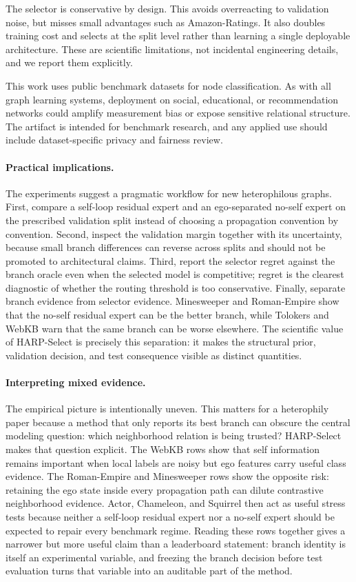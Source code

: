 \documentclass[letterpaper]{article} %
\newcommand{\method}{HARP-Select}
\begin{document}
The selector is conservative by design.
This avoids overreacting to validation noise, but misses small advantages such as Amazon-Ratings.
It also doubles training cost and selects at the split level rather than learning a single deployable architecture.
These are scientific limitations, not incidental engineering details, and we report them explicitly.

This work uses public benchmark datasets for node classification.
As with all graph learning systems, deployment on social, educational, or recommendation networks could amplify measurement bias or expose sensitive relational structure.
The artifact is intended for benchmark research, and any applied use should include dataset-specific privacy and fairness review.

\paragraph{Practical implications.}
The experiments suggest a pragmatic workflow for new heterophilous graphs.
First, compare a self-loop residual expert and an ego-separated no-self expert on the prescribed validation split instead of choosing a propagation convention by convention.
Second, inspect the validation margin together with its uncertainty, because small branch differences can reverse across splits and should not be promoted to architectural claims.
Third, report the selector regret against the branch oracle even when the selected model is competitive; regret is the clearest diagnostic of whether the routing threshold is too conservative.
Finally, separate branch evidence from selector evidence.
Minesweeper and Roman-Empire show that the no-self residual expert can be the better branch, while Tolokers and WebKB warn that the same branch can be worse elsewhere.
The scientific value of \method{} is precisely this separation: it makes the structural prior, validation decision, and test consequence visible as distinct quantities.

\paragraph{Interpreting mixed evidence.}
The empirical picture is intentionally uneven.
This matters for a heterophily paper because a method that only reports its best branch can obscure the central modeling question: which neighborhood relation is being trusted?
\method{} makes that question explicit.
The WebKB rows show that self information remains important when local labels are noisy but ego features carry useful class evidence.
The Roman-Empire and Minesweeper rows show the opposite risk: retaining the ego state inside every propagation path can dilute contrastive neighborhood evidence.
Actor, Chameleon, and Squirrel then act as useful stress tests because neither a self-loop residual expert nor a no-self expert should be expected to repair every benchmark regime.
Reading these rows together gives a narrower but more useful claim than a leaderboard statement: branch identity is itself an experimental variable, and freezing the branch decision before test evaluation turns that variable into an auditable part of the method.
\end{document}
